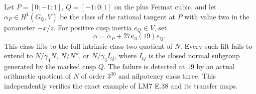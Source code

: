 \begin{proposition}
\label{E-finite-next-obstruction}
Let $P=[0:-1:1]$, $Q=[-1:0:1]$ on the plus Fermat
cubic, and let $\alpha_P\in H^1(G_{\mathbb Q},V)$ be
the class of the rational tangent at $P$ with value
two in the parameter $-x/z$. For positive cusp
inertia $e_Q\in V$, set
\[
           \alpha=\alpha_P+27\kappa_3(19)e_Q.
 \tag{E20.1}
\]
This class lifts to the full intrinsic class-two
quotient of $N$. Every such lift fails to extend
to $N/\gamma_4N$, $N/N''$, or $N/\gamma_3I_Q$,
where $I_Q$ is the closed normal subgroup generated
by the marked cusp $Q$. The failure is detected
at $19$ by an actual arithmetic quotient of $N$
of order $3^{30}$ and nilpotency class three.
This independently verifies the exact example
of LM7 E.38 and its transfer maps.
\end{proposition}
